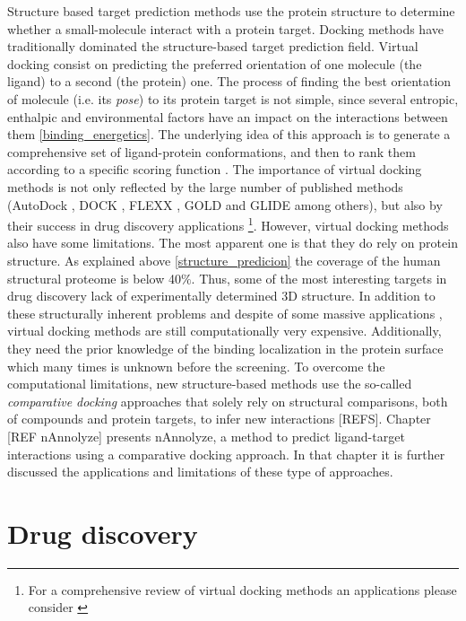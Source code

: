 \documentclass[12pt, a4paper,twoside]{tesi_upf}
\begin{document}
\par Structure based target prediction methods use the protein structure to determine whether a small-molecule interact with a protein target. Docking methods have traditionally dominated the structure-based target prediction field. Virtual docking consist on predicting the preferred orientation of one molecule (the ligand) to a second (the protein) one. The process of finding the best orientation of molecule (i.e. its \textit{pose}) to its protein target is not simple, since several entropic, enthalpic and environmental factors have an impact on the interactions between them \ref{binding_energetics}. The underlying idea of this approach is to generate a comprehensive set of ligand-protein conformations, and then to rank them according to a specific scoring function \cite{Alonso2006}. The importance of virtual docking methods is not only reflected by the large number of published methods  (AutoDock \cite{Morris2009, Trott2010}, DOCK \cite{Ewing1997}, FLEXX \cite{Rarey1996}, GOLD \cite{Jones1997} and GLIDE \cite{Friesner2004} among others), but also by their success in drug discovery applications \cite{Schames2004, Enyedy2001, Vangrevelinghe2003}\footnote{For a comprehensive review of virtual docking methods an applications please consider \cite{Kitchen2004}}. However, virtual docking methods also have some limitations. The most apparent one is that they do rely on protein structure. As explained above \ref{structure_predicion} the coverage of the human structural proteome is below 40$\%$. Thus, some of the most interesting targets in drug discovery lack of experimentally determined 3D structure. In addition to these structurally inherent  problems and despite of some massive applications \cite{Reardon2013},  virtual docking methods are still computationally very expensive. Additionally, they need the prior knowledge of the binding localization in the protein surface which many times is unknown before the screening. To overcome the computational limitations, new structure-based methods use the so-called \textit{comparative docking} approaches that solely rely on structural comparisons, both of compounds and protein targets, to infer new interactions [REFS]. Chapter [REF nAnnolyze] presents nAnnolyze, a method to predict ligand-target interactions using a comparative docking approach. In that chapter it is further discussed the applications and limitations of these type of approaches. 


\section{Drug discovery}\label{drug_discovery}
\end{document}

